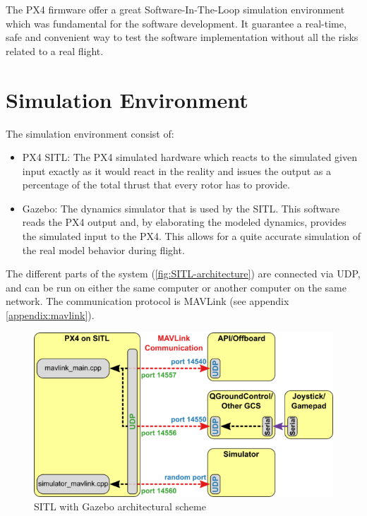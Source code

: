 The PX4 firmware offer a great Software-In-The-Loop  simulation environment which was fundamental for the software development. It guarantee a real-time, safe and convenient way to test the software implementation without all the risks related to a real flight.\\

\section{Simulation Environment} %
\label{sec:simulation_environment}
The simulation environment consist of:
\begin{itemize}
 	\item PX4 SITL: The PX4 simulated hardware which reacts to the simulated given input exactly as it would react in the reality and issues the output as a percentage of the total thrust that every rotor has to provide.
 	\item Gazebo: The dynamics simulator that is used by the SITL. This software reads the PX4 output and, by elaborating the modeled dynamics, provides the simulated input to the PX4. This allows for a quite accurate simulation of the real model behavior during flight.
 \end{itemize}
 The different parts of the system (\autoref{fig:SITL-architecture}) are connected via UDP, and can be run on either the same computer or another computer on the same network. The communication protocol is MAVLink (see appendix \ref{appendix:mavlink}).
 \begin{figure}[ht]
    \centering
    \includegraphics[width=.7\textwidth]{figures/C4/Px4_sitl_overview}
    \caption{SITL with Gazebo architectural scheme}
    \label{fig:SITL-architecture}
\end{figure}



